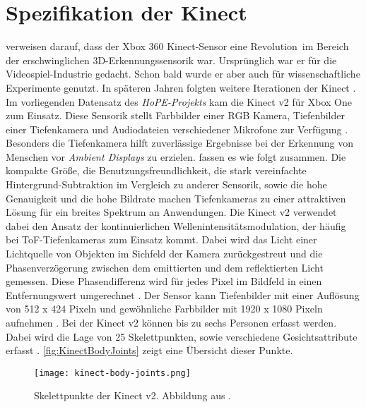 \section{Spezifikation der Kinect}
\label{2-SpezifikationKinect}
\citep{tolgyessy_evaluation_2021} verweisen darauf,
dass der Xbox 360 Kinect-Sensor eine \glqq Revolution\grqq\ im Bereich der erschwinglichen 3D-Erkennungssensorik war.
Ursprünglich war er für die Videospiel-Industrie gedacht.
Schon bald wurde er aber auch für wissenschaftliche Experimente genutzt.
In späteren Jahren folgten weitere Iterationen der Kinect \citep{tolgyessy_evaluation_2021}.
Im vorliegenden Datensatz des \emph{HoPE-Projekts} kam die Kinect v2 für Xbox One zum Einsatz.
Diese Sensorik stellt Farbbilder einer \ac{RGB} Kamera, Tiefenbilder einer Tiefenkamera
und Audiodateien verschiedener Mikrofone zur Verfügung \citep{windows-developer-center_microsoft_corporation_human_2014}.
Besonders die Tiefenkamera hilft zuverlässige Ergebnisse bei der Erkennung von Menschen vor \emph{Ambient Displays} zu erzielen.
\citet{li_time-flight_2014} fassen es wie folgt zusammen.
Die kompakte Größe, die Benutzungsfreundlichkeit,
die stark vereinfachte Hintergrund-Subtraktion im Vergleich zu anderer Sensorik, sowie die hohe Genauigkeit
und die hohe Bildrate machen Tiefenkameras zu einer attraktiven Lösung für ein breites Spektrum an Anwendungen.
Die Kinect v2 verwendet dabei den Ansatz der kontinuierlichen Wellenintensitätsmodulation,
der häufig bei \ac{ToF}-Tiefenkameras zum Einsatz kommt.
Dabei wird das Licht einer Lichtquelle von Objekten im Sichfeld der Kamera zurückgestreut
und die Phasenverzögerung zwischen dem emittierten und dem reflektierten Licht gemessen.
Diese Phasendifferenz wird für jedes Pixel im Bildfeld in einen Entfernungswert umgerechnet \citep{tolgyessy_evaluation_2021}.
Der Sensor kann Tiefenbilder mit einer Auflösung von 512 x 424 Pixeln
und gewöhnliche Farbbilder mit 1920 x 1080 Pixeln aufnehmen \citep{marin_multi-camera_2019}.
Bei der Kinect v2 können bis zu sechs Personen erfasst werden.
Dabei wird die Lage von 25 Skelettpunkten, sowie verschiedene Gesichtsattribute erfasst \citep{windows-developer-center_microsoft_corporation_human_2014}.
\autoref{fig:KinectBodyJoints} zeigt eine Übersicht dieser Punkte. 

\begin{figure}[ht]
  \begin{center}
  \texttt{[image: kinect-body-joints.png]}
  \end{center}
  \caption{Skelettpunkte der Kinect v2. Abbildung aus \citet{windows-developer-center_microsoft_corporation_human_2014}.}
  \label{fig:KinectBodyJoints}
\end{figure}


